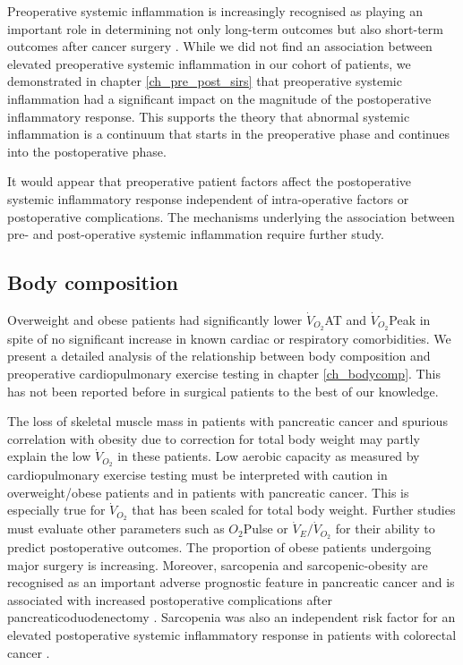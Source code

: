 Preoperative systemic inflammation is increasingly recognised as playing an important role in determining not only long-term outcomes but also short-term outcomes after cancer surgery \parencite{kubo_elevated_2013, mohri_correlation_2014, moyes_preoperative_2009, neal_preoperative_2011, vashist_glasgow_2010,  haupt_association_1997}.
While we did not find an association between elevated preoperative systemic inflammation in our cohort of patients, we demonstrated in chapter \ref{ch_pre_post_sirs} that preoperative systemic inflammation had a significant impact on  the magnitude of the postoperative inflammatory response.
This supports the theory that abnormal systemic inflammation is a continuum that starts in the preoperative phase and continues into the postoperative phase.

It would appear that preoperative patient factors affect the postoperative systemic inflammatory response independent of intra-operative factors or postoperative complications. 
The mechanisms underlying the association between pre- and post-operative systemic inflammation require further study.

\subsection{Body composition}
Overweight and obese patients had significantly lower $\dot{V}_{O_2}$AT and $\dot{V}_{O_2}$Peak in spite of no significant increase in known cardiac or respiratory comorbidities. 
We present a detailed analysis of the relationship between body composition and preoperative cardiopulmonary exercise testing in chapter \ref{ch_bodycomp}.
This has not been reported before in surgical patients to the best of our knowledge. 

The loss of skeletal muscle mass in patients with pancreatic cancer and spurious correlation with obesity due to correction for total body weight may partly explain the low $\dot{V}_{O_2}$ in these patients. 
Low aerobic capacity as measured by cardiopulmonary exercise testing must be interpreted with caution in overweight/obese patients and in patients with pancreatic cancer. 
This is especially true for $\dot{V}_{O_2}$ that has been scaled for total body weight.
Further studies must evaluate other parameters such as $O_2$Pulse or $\dot{V}_E/\dot{V}_{O_2}$ for their ability to predict postoperative outcomes. 
The proportion of obese patients undergoing major surgery is increasing. 
Moreover, sarcopenia and sarcopenic-obesity are recognised as an important adverse prognostic feature in pancreatic cancer \parencite{tan_sarcopenia_2009, peng_impact_2012} and is associated with increased postoperative complications after pancreaticoduodenectomy \parencite{joglekar_sarcopenia_2015, pausch_cachexia_2012}.
Sarcopenia was also an independent risk factor for an elevated postoperative systemic inflammatory response in patients with colorectal cancer \parencite{reisinger_sarcopenia_2015}.

